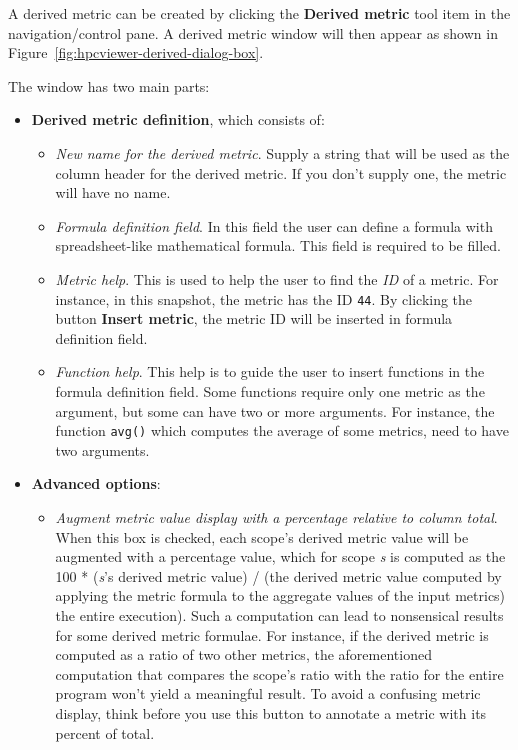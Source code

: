 A derived metric can be created by clicking the \textbf{Derived metric} tool item in the navigation/control pane.
A derived metric window will then appear as shown in Figure~\ref{fig:hpcviewer-derived-dialog-box}.


The window has two main parts:
\begin{itemize}

\item \textbf{Derived metric definition}, which consists of:

\begin{itemize}

\item \textit{New name for the derived metric}.
  Supply a string that will be used as the column header for the derived metric.
  If you don't supply one, the metric will have no name.

\item \textit{Formula definition field}.
  In this field the user can define a formula with spreadsheet-like mathematical formula.
  This field is required to be filled.

\item \textit{Metric help}.
  This is used to help the user to find the \textit{ID} of a metric.
  For instance, in this snapshot, the metric  has the ID \texttt{44}.
  By clicking the button \textbf{Insert metric}, the metric ID will be inserted in formula definition field.

\item \textit{Function help}.
  This help is to guide the user to insert functions in the formula definition field.
  Some functions require only one metric as the argument, but some can have two or more arguments.
  For instance, the function \texttt{avg()} which computes the average of some metrics, need to have two arguments.
\end{itemize}

\item \textbf{Advanced options}:
\begin{itemize}

\item \textit{Augment metric value display with a percentage relative to column total}.
  When this box is checked, each scope's derived metric value will be augmented with a percentage value, which for scope \textit{s} is computed as the 100 * (\textit{s}'s derived metric value) / (the derived metric value computed by applying the metric formula to the aggregate values of the input metrics) the entire execution).
  Such a computation can lead to nonsensical results for some derived metric formulae.
  For instance, if the derived metric is computed as a ratio of two other metrics, the aforementioned computation that compares the scope's ratio with the ratio for the entire program won't yield a meaningful result.
  To avoid a confusing metric display, think before you use this button to annotate a metric with its percent of total.


\end{itemize}
\end{itemize}
